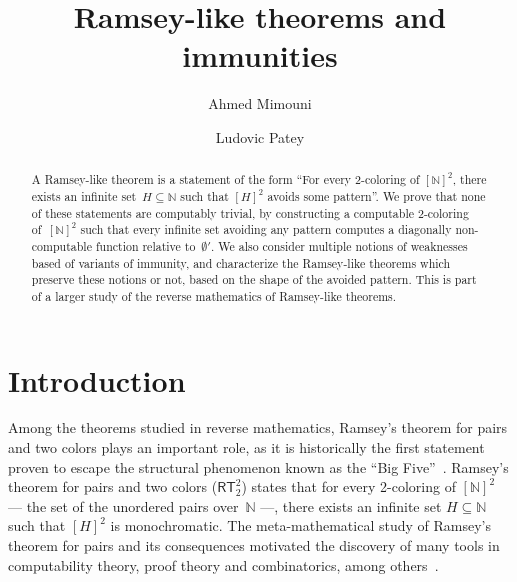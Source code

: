 \documentclass{article}
\title{Ramsey-like theorems and immunities}
\author{Ahmed Mimouni \and Ludovic Patey}
\newcommand{\RT}[0]{\mathsf{RT}}
\newcommand{\NN}[0]{\mathbb{N}}
\def\qt#1{``#1''}%
\def\NN{\mathbb{N}}
\def\qt#1{``#1''}%
\numberwithin{theorem}{section}
\theoremstyle{definition}
\begin{document}
\maketitle

\begin{abstract}
A Ramsey-like theorem is a statement of the form \qt{For every 2-coloring of $[\NN]^2$, there exists an infinite set~$H \subseteq \NN$ such that $[H]^2$ avoids some pattern}. We prove that none of these statements are computably trivial, by constructing a computable 2-coloring of~$[\NN]^2$ such that every infinite set avoiding any pattern computes a diagonally non-computable function relative to~$\emptyset'$. We also consider multiple notions of weaknesses based of variants of immunity, and characterize the Ramsey-like theorems which preserve these notions or not, based on the shape of the avoided pattern. This is part of a larger study of the reverse mathematics of Ramsey-like theorems.
\end{abstract}


\section{Introduction}

Among the theorems studied in reverse mathematics, Ramsey's theorem for pairs and two colors plays an important role, as it is historically the first statement proven to escape the structural phenomenon known as the \qt{Big Five}~\cite{simpson_2009,montalban2011open}. Ramsey's theorem for pairs and two colors ($\RT^2_2$) states that for every 2-coloring of $[\NN]^2$ --- the set of the unordered pairs over~$\NN$ ---, there exists an infinite set $H \subseteq \NN$ such that $[H]^2$ is monochromatic. The meta-mathematical study of Ramsey's theorem for pairs and its consequences motivated the discovery of many tools in computability theory, proof theory and combinatorics, among others~\cite{seetapun1995strength,cholak_jockusch_slaman_2001,liu2012rt22,monin2021srt22,patey2018proof}. 
\end{document}
